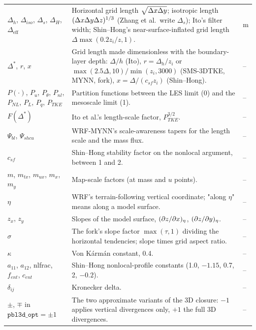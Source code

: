 \begin{xltabular}{\linewidth}{@{}>{\raggedright\arraybackslash}p{3.6cm} >{\raggedright\arraybackslash}X >{\raggedright\arraybackslash}p{2.3cm}@{}}
$\Delta_h$, $\Delta_{iso}$, $\Delta_s$, $\Delta_H$, $\Delta_{\mathrm{eff}}$ & Horizontal grid length $\sqrt{\Delta x\Delta y}$; isotropic length $(\Delta x\Delta y\Delta z)^{1/3}$ (Zhang et al.\ write $\Delta_s$); Ito's filter width; Shin--Hong's near-surface-inflated grid length $\Delta\max(0.2z_i/z, 1)$. & m \\
$\Delta^*$, $r$, $x$ & Grid length made dimensionless with the boundary-layer depth: $\Delta/h$ (Ito), $r = \Delta_h/z_i$ or $\max(2.5\Delta, 10)/\min(z_i, 3000)$ (SMS-3DTKE, MYNN, fork), $x = \Delta/(c_{sf}z_i)$ (Shin--Hong). & -- \\
$P(\cdot)$, $P_u$, $P_\theta$, $P_{nl}$, $P_{NL}$, $P_L$, $P_q$, $P_{TKE}$ & Partition functions between the LES limit (0) and the mesoscale limit (1). & -- \\
$F(\Delta^*)$ & Ito et al.'s length-scale factor, $P_{TKE}^{3/2}$. & -- \\
$\Psi_{bl}$, $\Psi_{shcu}$ & WRF-MYNN's scale-awareness tapers for the length scale and the mass flux. & -- \\
$c_{sf}$ & Shin--Hong stability factor on the nonlocal argument, between 1 and 2. & -- \\
$m$, $m_{tx}$, $m_{ux}$, $m_x$, $m_y$ & Map-scale factors (at mass and $u$ points). & -- \\
$\eta$ & WRF's terrain-following vertical coordinate; "along $\eta$" means along a model surface. & -- \\
$z_x$, $z_y$ & Slopes of the model surface, $(\partial z/\partial x)_\eta$, $(\partial z/\partial y)_\eta$. & -- \\
$\sigma$ & The fork's slope factor $\max(\tau, 1)$ dividing the horizontal tendencies; slope times grid aspect ratio. & -- \\
$\kappa$ & Von K\'arm\'an constant, 0.4. & -- \\
$a_{11}$, $a_{12}$, nlfrac, $f_{ent}$, $c_{ent}$ & Shin--Hong nonlocal-profile constants (1.0, $-1.15$, 0.7, 2, $-0.2$). & -- \\
$\delta_{ij}$ & Kronecker delta. & -- \\
$\pm$, $\mp$ in $\texttt{pbl3d\_opt} = \pm 1$ & The two approximate variants of the 3D closure: $-1$ applies vertical divergences only, $+1$ the full 3D divergences. & -- \\
\end{xltabular}
\normalsize

